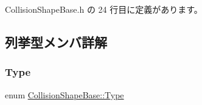  Collision\+Shape\+Base.\+h の 24 行目に定義があります。



\subsection{列挙型メンバ詳解}
\mbox{\label{class_collision_shape_base_a8abcef092855ad0ca191047044b002cb}} 
\subsubsection{\texorpdfstring{Type}{Type}}
{\footnotesize\ttfamily enum \mbox{\hyperlink{class_collision_shape_base_a8abcef092855ad0ca191047044b002cb}{Collision\+Shape\+Base\+::\+Type}}\hspace{0.3cm}{\ttfamily [strong]}}

